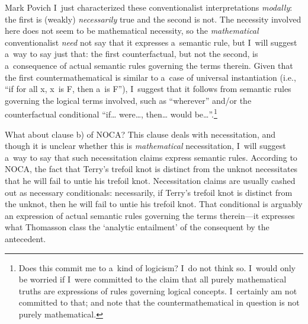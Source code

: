 \begin{artengenv}{Mark Povich}
I~just characterized these conventionalist interpretations \textit{modally}: the first is (weakly) \textit{necessarily} true and the second is not. The necessity involved here does not seem to be mathematical necessity, so the \textit{mathematical} conventionalist \textit{need} not say that it expresses a~semantic rule, but I~will suggest a~way to say just that: the first counterfactual, but not the second, is a~consequence of actual semantic rules governing the terms therein. Given that the first countermathematical is similar to a~case of universal instantiation (i.e., ``if for all x, x~is F, then a~is F''), I~suggest that it follows from semantic rules governing the logical terms involved, such as ``wherever'' and/or the counterfactual conditional ``if… were…, then… would be…''.\footnote{Does this commit me to a~kind of logicism? I~do not think so. I~would only be worried if I~were committed to the claim that all purely mathematical truths are expressions of rules governing logical concepts. I~certainly am not committed to that; and note that the countermathematical in question is not purely mathematical.}

What about clause b) of NOCA? This clause deals with necessitation, and though it is unclear whether this is \textit{mathematical} necessitation, I~will suggest a~way to say that such necessitation claims express semantic rules. According to NOCA, the fact that Terry's trefoil knot is distinct from the unknot necessitates that he will fail to untie his trefoil knot. Necessitation claims are usually cashed out as necessary conditionals: necessarily, if Terry's trefoil knot is distinct from the unknot, then he will fail to untie his trefoil knot. That conditional is arguably an expression of actual semantic rules governing the terms therein---it expresses what Thomasson class the ‘analytic entailment' of the consequent by the antecedent.


\end{artengenv}
